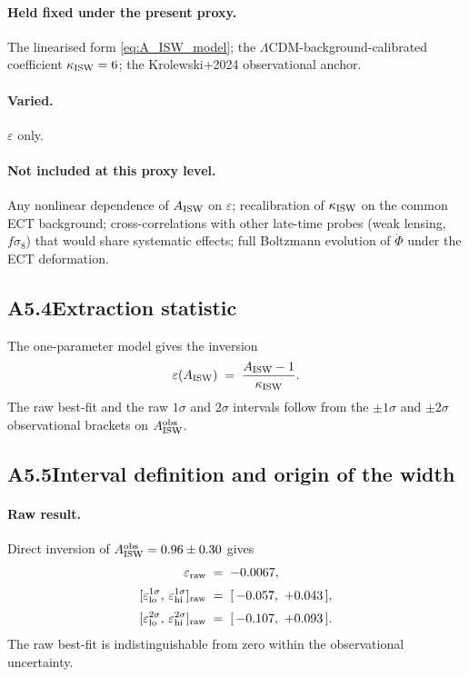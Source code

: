 \paragraph{Held fixed under the present proxy.}
The linearised form \eqref{eq:A_ISW_model}; the
$\Lambda$CDM-background-calibrated coefficient
$\kappa_{\rm ISW} = 6$; the Krolewski+2024 observational anchor.

\paragraph{Varied.}
$\varepsilon$ only.

\paragraph{Not included at this proxy level.}
Any nonlinear dependence of $A_{\rm ISW}$ on $\varepsilon$;
recalibration of $\kappa_{\rm ISW}$ on the common ECT background;
cross-correlations with other late-time probes (weak lensing,
$f\sigma_8$) that would share systematic effects; full Boltzmann
evolution of $\dot\Phi$ under the ECT deformation.

\subsection*{A5.4\quad Extraction statistic}

The one-parameter model gives the inversion
\begin{equation}
\varepsilon(A_{\rm ISW})
\;=\;
\frac{A_{\rm ISW} - 1}{\kappa_{\rm ISW}}.
\end{equation}
The raw best-fit and the raw $1\sigma$ and $2\sigma$ intervals
follow from the $\pm 1\sigma$ and $\pm 2\sigma$ observational
brackets on $A_{\rm ISW}^{\rm obs}$.

\subsection*{A5.5\quad Interval definition and origin of the width}

\paragraph{Raw result.}
Direct inversion of $A_{\rm ISW}^{\rm obs} = 0.96 \pm 0.30$ gives
\begin{align}
\varepsilon_{\rm raw}
&\;=\; -0.0067,
\\[2pt]
[\varepsilon_{\rm lo}^{1\sigma},\,\varepsilon_{\rm hi}^{1\sigma}]_{\rm raw}
&\;=\; [\,-0.057,\ +0.043\,],
\\[2pt]
[\varepsilon_{\rm lo}^{2\sigma},\,\varepsilon_{\rm hi}^{2\sigma}]_{\rm raw}
&\;=\; [\,-0.107,\ +0.093\,].
\end{align}
The raw best-fit is indistinguishable from zero within the
observational uncertainty.

